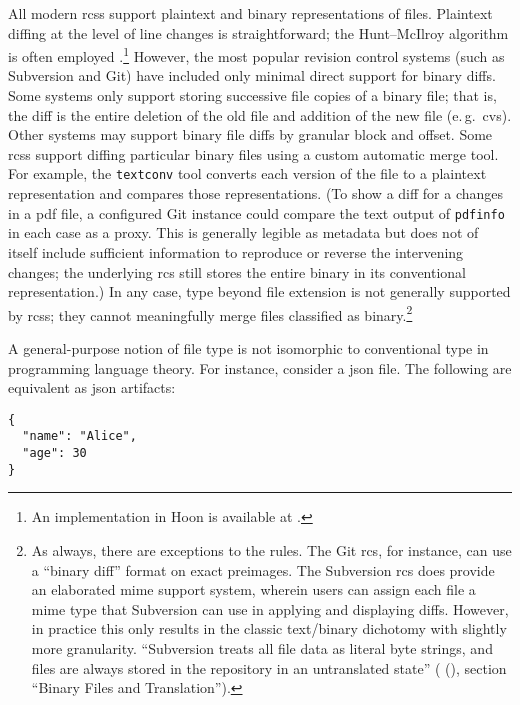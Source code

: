 \documentclass[twoside]{article}
\begin{document}
All modern {\sc rcs}s support plaintext and binary representations of files.  Plaintext diffing at the level of line changes is straightforward; the Hunt–McIlroy algorithm is often employed \citep{Hunt1976}.\footnote{An implementation in Hoon is available at .}  However, the most popular revision control systems (such as Subversion and Git) have included only minimal direct support for binary diffs.  Some systems only support storing successive file copies of a binary file; that is, the diff is the entire deletion of the old file and addition of the new file (e.\,g.\ {\sc cvs}).  Other systems may support binary file diffs by granular block and offset.  Some {\sc rcs}s support diffing particular binary files using a custom automatic merge tool.  For example, the \texttt{textconv} tool converts each version of the file to a plaintext representation and compares those representations.  (To show a diff for a changes in a {\sc pdf} file, a configured Git instance could compare the text output of \texttt{pdfinfo} in each case as a proxy.  This is generally legible as metadata but does not of itself include sufficient information to reproduce or reverse the intervening changes; the underlying {\sc rcs} still stores the entire binary in its conventional representation.)  In any case, type beyond file extension is not generally supported by {\sc rcs}s; they cannot meaningfully merge files classified as binary.\footnote{As always, there are exceptions to the rules.  The Git {\sc rcs}, for instance, can use a “binary diff” format on exact preimages.  The Subversion {\sc rcs} does provide an elaborated {\sc mime} support system, wherein users can assign each file a {\sc mime} type that Subversion can use in applying and displaying diffs.  However, in practice this only results in the classic text/binary dichotomy with slightly more granularity.  ``Subversion treats all file data as literal byte strings, and files are always stored in the repository in an untranslated state'' (\citeauthor{Collins2016} (\citeyear{Collins2016}), section ``Binary Files and Translation'').}

A general-purpose notion of file type is not isomorphic to conventional type in programming language theory.  For instance, consider a {\sc json} file.  The following are equivalent as {\sc json} artifacts:

\begin{lstlisting}[style=listingcode]
{
  "name": "Alice",
  "age": 30
}
\end{lstlisting}
\end{document}

